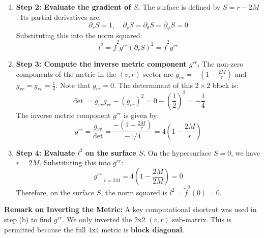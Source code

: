 \begin{solution}
\begin{enumerate}
    \item \textbf{Step 2: Evaluate the gradient of $S$.}
    The surface is defined by $S = r - 2M$. Its partial derivatives are:
    \[ \partial_r S = 1, \quad \partial_v S = \partial_\theta S = \partial_\phi S = 0 \]
    Substituting this into the norm squared:
    \[ l^2 = \tilde{f}^2 g^{rr} (\partial_r S)^2 = \tilde{f}^2 g^{rr} \]
    
    \item \textbf{Step 3: Compute the inverse metric component $g^{rr}$.}
    The non-zero components of the metric in the $(v, r)$ sector are $g_{vv} = -(1 - \frac{2M}{r})$ and $g_{vr} = g_{rv} = \frac{1}{2}$. Note that $g_{rr} = 0$.
    The determinant of this $2 \times 2$ block is:
    \[ \det = g_{vv}g_{rr} - (g_{vr})^2 = 0 - \left(\frac{1}{2}\right)^2 = -\frac{1}{4} \]
    The inverse metric component $g^{rr}$ is given by:
    \[ g^{rr} = \frac{g_{vv}}{\det} = \frac{-(1 - \frac{2M}{r})}{-1/4} = 4\left(1 - \frac{2M}{r}\right) \]
    
    \item \textbf{Step 4: Evaluate $l^2$ on the surface $S$.}
    On the hypersurface $S = 0$, we have $r = 2M$.
    Substituting this into $g^{rr}$:
    \[ g^{rr}\Big|_{r=2M} = 4\left(1 - \frac{2M}{2M}\right) = 0 \]
    Therefore, on the surface $S$, the norm squared is $l^2 = \tilde{f}^2 (0) = 0$.
\end{enumerate}

\textbf{Remark on Inverting the Metric:}
A key computational shortcut was used in step (b) to find $g^{rr}$. We only inverted the 2x2 $(v, r)$ sub-matrix. This is permitted because the full 4x4 metric is \textbf{block diagonal}.


\end{solution}
